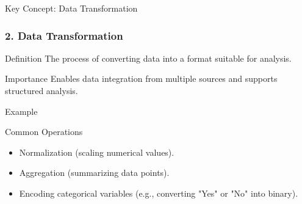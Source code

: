 \documentclass[aspectratio=169]{beamer}
\begin{document}
\begin{frame}{Key Concept: Data Transformation}
    \frametitle{2. Data Transformation}
    \begin{block}{Definition}
        The process of converting data into a format suitable for analysis.
    \end{block}
    
    \begin{block}{Importance}
        Enables data integration from multiple sources and supports structured analysis.
    \end{block}
    
    \begin{block}{Example}
    \end{block}
    
    \begin{block}{Common Operations}
        \begin{itemize}
            \item Normalization (scaling numerical values).
            \item Aggregation (summarizing data points).
            \item Encoding categorical variables (e.g., converting "Yes" or "No" into binary).
        \end{itemize}
    \end{block}
\end{frame}
\end{document}
